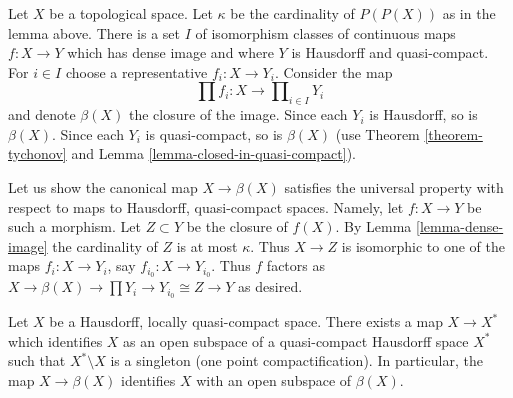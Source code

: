 \noindent
Let $X$ be a topological space. Let $\kappa$ be the cardinality of
$P(P(X))$ as in the lemma above. There is a set $I$ of isomorphism
classes of continuous maps $f : X \to Y$ which has dense image and
where $Y$ is Hausdorff and quasi-compact. For $i \in I$ choose a
representative $f_i : X \to Y_i$. Consider the map
$$
\prod f_i : X \longrightarrow \prod\nolimits_{i \in I} Y_i
$$
and denote $\beta(X)$ the closure of the image. Since each $Y_i$ is
Hausdorff, so is $\beta(X)$. Since each $Y_i$ is quasi-compact, so
is $\beta(X)$ (use Theorem \ref{theorem-tychonov} and
Lemma \ref{lemma-closed-in-quasi-compact}).

\medskip\noindent
Let us show the canonical map $X \to \beta(X)$ satisfies the universal
property with respect to maps to Hausdorff, quasi-compact spaces. Namely,
let $f : X \to Y$ be such a morphism. Let $Z \subset Y$ be the closure
of $f(X)$. By Lemma \ref{lemma-dense-image} the cardinality of $Z$
is at most $\kappa$. Thus $X \to Z$ is isomorphic to one of the maps
$f_i : X \to Y_i$, say $f_{i_0} : X \to Y_{i_0}$. Thus $f$ factors as
$X \to \beta(X) \to \prod Y_i \to Y_{i_0} \cong Z \to Y$ as desired.

\begin{lemma}
\label{lemma-one-point-compactification}
Let $X$ be a Hausdorff, locally quasi-compact space.
There exists a map $X \to X^*$ which identifies $X$ as an open
subspace of a quasi-compact Hausdorff space $X^*$ such that
$X^* \setminus X$ is a singleton (one point compactification).
In particular, the map $X \to \beta(X)$ identifies $X$
with an open subspace of $\beta(X)$.
\end{lemma}

